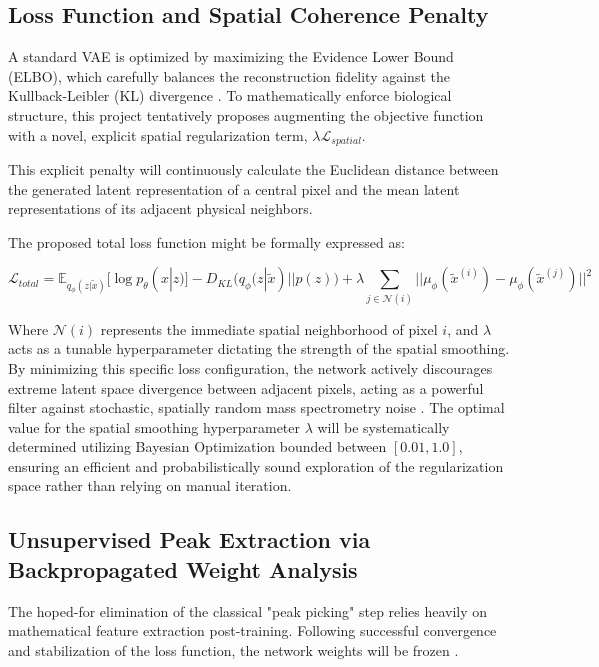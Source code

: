 \documentclass[
12pt, %
oneside, %
english, %
onehalfspacing, %
nolistspacing, %
headsepline, %
]{MastersDoctoralThesis} %
\begin{document}
\subsection{Loss Function and Spatial Coherence Penalty}
A standard VAE is optimized by maximizing the Evidence Lower Bound (ELBO), which carefully balances the reconstruction fidelity against the Kullback-Leibler (KL) divergence \citep{abdelmoula2021peak}. To mathematically enforce biological structure, this project tentatively proposes augmenting the objective function with a novel, explicit spatial regularization term, $\lambda \mathcal{L}_{spatial}$.

This explicit penalty will continuously calculate the Euclidean distance between the generated latent representation of a central pixel and the mean latent representations of its adjacent physical neighbors.

The proposed total loss function might be formally expressed as:

$$ \mathcal{L}_{total}=\mathbb{E}_{q_\phi(z|\tilde{x})}[\log p_\theta(x|z)]-D_{KL}(q_\phi(z|\tilde{x})||p(z))+\lambda \sum_{j \in \mathcal{N}(i)} ||\mu_\phi(\tilde{x}^{(i)})-\mu_\phi(\tilde{x}^{(j)})||^2 $$

Where $\mathcal{N}(i)$ represents the immediate spatial neighborhood of pixel $i$, and $\lambda$ acts as a tunable hyperparameter dictating the strength of the spatial smoothing. By minimizing this specific loss configuration, the network actively discourages extreme latent space divergence between adjacent pixels, acting as a powerful filter against stochastic, spatially random mass spectrometry noise \citep{winderbaum2015feature}.  The optimal value for the spatial smoothing hyperparameter $\lambda$ will be systematically determined utilizing Bayesian Optimization bounded between $[0.01, 1.0]$, ensuring an efficient and probabilistically sound exploration of the regularization space rather than relying on manual iteration.

\subsection{Unsupervised Peak Extraction via Backpropagated Weight Analysis}
The hoped-for elimination of the classical "peak picking" step relies heavily on mathematical feature extraction post-training. Following successful convergence and stabilization of the loss function, the network weights will be frozen \citep{abdelmoula2021peak}.
\end{document}
